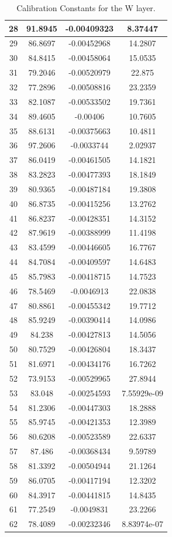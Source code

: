 \begin{table}[h]
{\begin{tabular}{|c|c|c|c|}
28 & 91.8945 & -0.00409323 & 8.37447 \\ \hline 
29 & 86.8697 & -0.00452968 & 14.2807 \\ \hline 
30 & 84.8415 & -0.00458064 & 15.0535 \\ \hline 
31 & 79.2046 & -0.00520979 & 22.875 \\ \hline 
32 & 77.2896 & -0.00508816 & 23.2359 \\ \hline 
33 & 82.1087 & -0.00533502 & 19.7361 \\ \hline 
34 & 89.4605 & -0.00406 & 10.7605 \\ \hline 
35 & 88.6131 & -0.00375663 & 10.4811 \\ \hline 
36 & 97.2606 & -0.0033744 & 2.02937 \\ \hline 
37 & 86.0419 & -0.00461505 & 14.1821 \\ \hline 
38 & 83.2823 & -0.00477393 & 18.1849 \\ \hline 
39 & 80.9365 & -0.00487184 & 19.3808 \\ \hline 
40 & 86.8735 & -0.00415256 & 13.2762 \\ \hline 
41 & 86.8237 & -0.00428351 & 14.3152 \\ \hline 
42 & 87.9619 & -0.00388999 & 11.4198 \\ \hline 
43 & 83.4599 & -0.00446605 & 16.7767 \\ \hline 
44 & 84.7084 & -0.00409597 & 14.6483 \\ \hline 
45 & 85.7983 & -0.00418715 & 14.7523 \\ \hline 
46 & 78.5469 & -0.0046913 & 22.0838 \\ \hline 
47 & 80.8861 & -0.00455342 & 19.7712 \\ \hline 
48 & 85.9249 & -0.00390414 & 14.0986 \\ \hline 
49 & 84.238 & -0.00427813 & 14.5056 \\ \hline 
50 & 80.7529 & -0.00426804 & 18.3437 \\ \hline 
51 & 81.6971 & -0.00434176 & 16.7262 \\ \hline 
52 & 73.9153 & -0.00529965 & 27.8944 \\ \hline 
53 & 83.048 & -0.00254593 & 7.55929e-09 \\ \hline 
54 & 81.2306 & -0.00447303 & 18.2888 \\ \hline 
55 & 85.9745 & -0.00421353 & 12.3989 \\ \hline 
56 & 80.6208 & -0.00523589 & 22.6337 \\ \hline 
57 & 87.486 & -0.00368434 & 9.59789 \\ \hline 
58 & 81.3392 & -0.00504944 & 21.1264 \\ \hline 
59 & 86.0705 & -0.00417194 & 12.3202 \\ \hline 
60 & 84.3917 & -0.00441815 & 14.8435 \\ \hline 
61 & 77.2549 & -0.0049831 & 23.2266 \\ \hline 
62 & 78.4089 & -0.00232346 & 8.83974e-07 \\ \hline  
        \end{tabular}
        }
        \caption{Calibration Constants for the W layer.}
        \label{tab:WattenCSimulation}
\end{table}
\FloatBarrier
